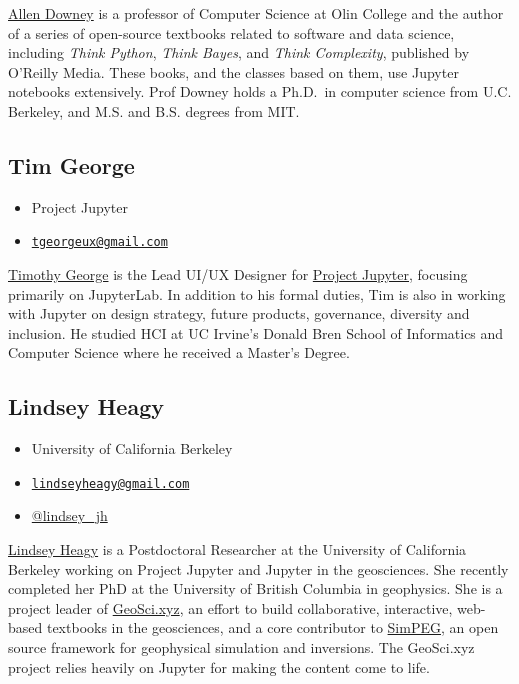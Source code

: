 \documentclass[]{book}
\providecommand{\tightlist}{%
  \setlength{\itemsep}{0pt}\setlength{\parskip}{0pt}}
\begin{document}
\href{http://www.allendowney.com/wp/}{Allen Downey} is a professor of
Computer Science at Olin College and the author of a series of
open-source textbooks related to software and data science, including
\emph{Think Python}, \emph{Think Bayes}, and \emph{Think Complexity},
published by O'Reilly Media. These books, and the classes based on them,
use Jupyter notebooks extensively. Prof Downey holds a Ph.D.~in computer
science from U.C. Berkeley, and M.S. and B.S. degrees from MIT.

\subsection*{Tim George}\label{tim-george}

\begin{itemize}
\tightlist
\item
  Project Jupyter
\item
  \href{mailto:tgeorgeux@gmail.com}{\nolinkurl{tgeorgeux@gmail.com}}
\end{itemize}

\href{https://www.tgeorgeux.com/}{Timothy George} is the Lead UI/UX
Designer for \href{https://jupyter.org/}{Project Jupyter}, focusing
primarily on JupyterLab. In addition to his formal duties, Tim is also
in working with Jupyter on design strategy, future products, governance,
diversity and inclusion. He studied HCI at UC Irvine's Donald Bren
School of Informatics and Computer Science where he received a Master's
Degree.

\subsection*{Lindsey Heagy}\label{lindsey-heagy}

\begin{itemize}
\tightlist
\item
  University of California Berkeley
\item
  \href{mailto:lindseyheagy@gmail.com}{\nolinkurl{lindseyheagy@gmail.com}}
\item
  \href{https://twitter.com/lindsey_jh}{@lindsey\_jh}
\end{itemize}

\href{https://www.lindseyjh.ca/}{Lindsey Heagy} is a Postdoctoral
Researcher at the University of California Berkeley working on Project
Jupyter and Jupyter in the geosciences. She recently completed her PhD
at the University of British Columbia in geophysics. She is a project
leader of \href{http://geosci.xyz}{GeoSci.xyz}, an effort to build
collaborative, interactive, web-based textbooks in the geosciences, and
a core contributor to \href{https://www.simpeg.xyz/}{SimPEG}, an open
source framework for geophysical simulation and inversions. The
GeoSci.xyz project relies heavily on Jupyter for making the content come
to life.
\end{document}
